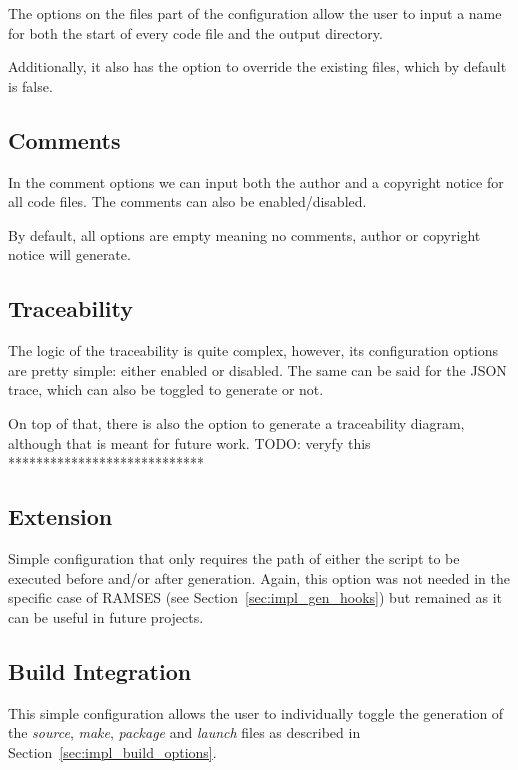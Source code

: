 The options on the files part of the configuration allow the user to input a name for both the start of every code file and the output directory.

Additionally, it also has the option to override the existing files, which by default is false.



\subsection{Comments}
\label{sec:dsl_comments}

In the comment options we can input both the author and a copyright notice for all code files. The comments can also be enabled/disabled. 

By default, all options are empty meaning no comments, author or copyright notice will generate.



\subsection{Traceability}
\label{sec:dsl_trace}

The logic of the traceability is quite complex, however, its configuration options are pretty simple: either enabled or disabled. The same can be said for the \gls{JSON} trace, which can also be toggled to generate or not.

On top of that, there is also the option to generate a traceability diagram, although that is meant for future work. TODO: veryfy this ****************************



\subsection{Extension}
\label{sec:dsl_ext}

Simple configuration that only requires the path of either the script to be executed before and/or after generation. Again, this option was not needed in the specific case of \gls{RAMSES} (see Section~\ref{sec:impl_gen_hooks}) but remained as it can be useful in future projects.



\subsection{Build Integration}
\label{sec:dsl_build}

This simple configuration allows the user to individually toggle the generation of the \textit{source}, \textit{make}, \textit{package} and \textit{launch} files as described in Section~\ref{sec:impl_build_options}. 

